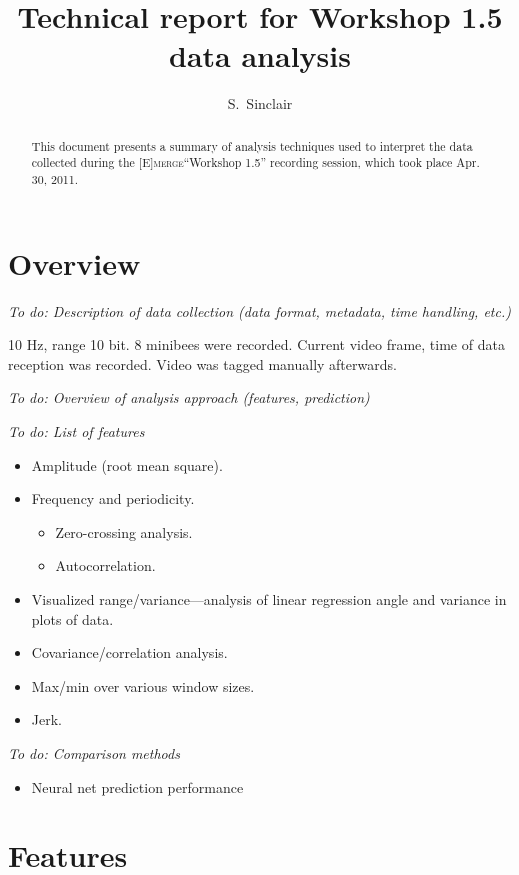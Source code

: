 \documentclass{article}
\title{Technical report for Workshop 1.5 data analysis}
\author{S.~Sinclair}
\newcommand{\emerge}{\textsc{[E]merge}\xspace}
\newcommand{\todo}[1]{\emph{To do: #1}}
\begin{document}
\maketitle

\begin{abstract}
This document presents a summary of analysis techniques used to
interpret the data collected during the \emerge ``Workshop 1.5''
recording session, which took place Apr. 30, 2011.
\end{abstract}

\section{Overview}

\todo{Description of data collection (data format, metadata, time handling, etc.)}

10 Hz, range 10 bit.  8 minibees were recorded.  Current video frame,
time of data reception was recorded.  Video was tagged manually
afterwards.

\todo{Overview of analysis approach (features, prediction)}

\todo{List of features}

\begin{itemize}
  \item Amplitude (root mean square).
  \item Frequency and periodicity.
    \begin{itemize}
    \item Zero-crossing analysis.
    \item Autocorrelation.
    \end{itemize}
  \item Visualized range/variance---analysis of linear regression
    angle and variance in plots of data.
  \item Covariance/correlation analysis.
  \item Max/min over various window sizes.
  \item Jerk.
\end{itemize}

\todo{Comparison methods}

\begin{itemize}
  \item Neural net prediction performance
\end{itemize}

\section{Features}
\end{document}
